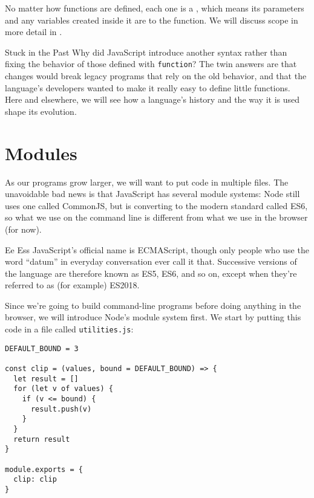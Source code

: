 No matter how functions are defined,
each one is a ,
which means its parameters and any variables created inside it are  to the function.
We will discuss scope in more detail in .

\begin{aside}{Stuck in the Past}
  Why did JavaScript introduce another syntax
  rather than fixing the behavior of those defined with \texttt{function}?
  The twin answers are that changes would break legacy programs that rely on the old behavior,
  and that the language's developers wanted to make it really easy to define little functions.
  Here and elsewhere,
  we will see how a language's history and the way it is used shape its evolution.
\end{aside}

\section{Modules}\label{s:basics-modules}

As our programs grow larger,
we will want to put code in multiple files.
The unavoidable bad news is that JavaScript has several module systems:
Node still uses one called CommonJS,
but is converting to the modern standard called ES6,
so what we use on the command line is different from what we use in the browser (for now).

\begin{aside}{Ee Ess}
  JavaScript's official name is ECMAScript,
  though only people who use the word ``datum'' in everyday conversation ever call it that.
  Successive versions of the language are therefore known as ES5, ES6, and so on,
  except when they're referred to as (for example) ES2018.
\end{aside}

Since we're going to build command-line programs before doing anything in the browser,
we will introduce Node's module system first.
We start by putting this code in a file called \texttt{utilities.js}:

\begin{verbatim}
DEFAULT_BOUND = 3

const clip = (values, bound = DEFAULT_BOUND) => {
  let result = []
  for (let v of values) {
    if (v <= bound) {
      result.push(v)
    }
  }
  return result
}

module.exports = {
  clip: clip
}
\end{verbatim}

